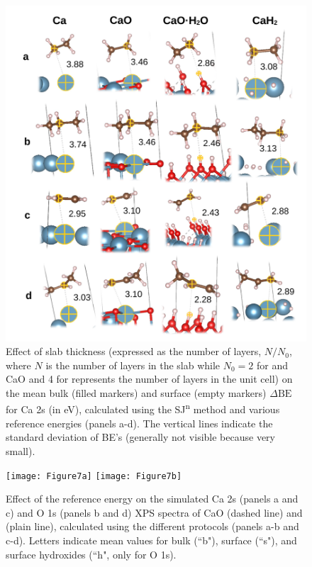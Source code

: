 \documentclass[%
aip,
amsmath,amssymb,
preprint,%
jcp,
showkeys,
]{revtex4-2}
\def\dbe{\ensuremath{\Delta\text{BE}}}
\begin{document}
\begin{figure}[p]
	\centering
	\includegraphics[width=\linewidth]{Figure6}
	\caption{Effect of slab thickness (expressed as the number of layers, $N/N_0$, where $N$ is the number of layers in the slab while $N_0 = 2$ for  and CaO and 4 for  represents the number of layers in the unit cell)  on the mean bulk (filled markers) and surface (empty markers) \dbe{} for Ca 2s (in \si{\electronvolt}), calculated using the SJ\textsuperscript{n} method and various reference energies (panels a-d). The vertical lines indicate the standard deviation of BE's (generally not visible because very small).}
	\label{fig:slabsthicknessSJn}
\end{figure}


\begin{figure}[p]
	\centering
	\texttt{[image: Figure7a]}
	\texttt{[image: Figure7b]}
	\caption{Effect of the reference energy on the simulated Ca 2s (panels a and c)  and O 1s (panels b and d) XPS spectra of CaO (dashed line)  and  (plain line), calculated using the different protocols (panels a-b and c-d). Letters indicate mean values for bulk (``b"), surface (``s"), and surface hydroxides (``h", only for   O 1s).}
	\label{fig:slabOH2}
\end{figure}
\end{document}
